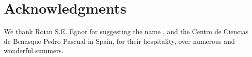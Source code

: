 \section{Acknowledgments}

We thank Roian S.E. Egnor for suggesting the name \rscape, and the
Centro de Ciencias de Benasque Pedro Pascual in Spain, for their
hospitality, over numerous and wonderful summers.

\label{manualend}
